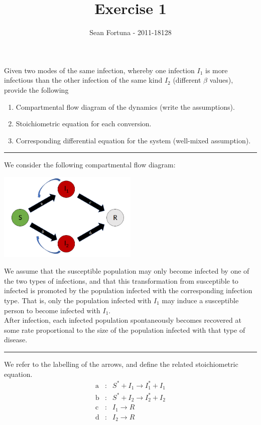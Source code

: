 \documentclass[10pt,a4paper]{article}
\title{Exercise 1}
\author{Sean Fortuna - 2011-18128}
\date{}
\newcommand{\topic}{\vspace{-1mm} \noindent \rule{0.5\textwidth}{0.4pt}  \vspace{1mm}}
\begin{document}
\maketitle

Given two modes of the same infection, whereby one infection $I_1$ is more infectious than the other infection of the same kind $I_2$ (different $\beta$ values), provide the following
\begin{enumerate}
\item Compartmental flow diagram of the dynamics (write the assumptions).
\item Stoichiometric equation for each conversion.
\item Corresponding differential equation for the system (well-mixed assumption).
\end{enumerate}

\topic
We consider the following compartmental flow diagram:
\begin{center}
\includegraphics[width=0.5\textwidth]{model.png} 
\end{center}
We assume that the susceptible population may only become infected by one of the two types of infections, and that this transformation from susceptible to infected is promoted by the population infected with the corresponding infection type. That is, only the population infected with $I_1$ may induce a susceptible person to become infected with $I_1$. \\

After infection, each infected population spontaneously becomes recovered at some rate proportional to the size of the population infected with that type of disease.

\topic

We refer to the labelling of the arrows, and define the related stoichiometric equation.
\begin{equation}
\begin{array}{ccc}
\textrm{a}&:& S^* + I_1 \to I_1^* + I_1 \\
\textrm{b}&:& S^* + I_2 \to I_2^* + I_2 \\
\textrm{c}&:& I_1 \to R \\
\textrm{d}&:& I_2 \to R
\end{array}
\end{equation}
\end{document}
